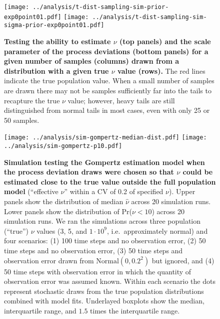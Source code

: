 \begin{figure}[htbp]
\begin{center}
\texttt{[image: ../analysis/t-dist-sampling-sim-prior-exp0point01.pdf]}
\texttt{[image: ../analysis/t-dist-sampling-sim-sigma-prior-exp0point01.pdf]}

\caption{\textbf{Testing the ability to estimate $\nu$ (top panels) and the scale parameter of the process deviations (bottom panels) for a given number of samples (columns) drawn from a distribution with a given true $\nu$ value (rows).} The red lines indicate the true population value. When a small number of samples are drawn there may not be samples sufficiently far into the tails to recapture the true $\nu$ value; however, heavy tails are still distinguished from normal tails in most cases, even with only 25 or 50 samples.}

\label{fig:sim-nu}
\end{center}
\end{figure}

\clearpage

\begin{figure}[htbp]
\begin{center}
\texttt{[image: ../analysis/sim-gompertz-median-dist.pdf]}
\texttt{[image: ../analysis/sim-gompertz-p10.pdf]}

\caption{\textbf{Simulation testing the Gompertz estimation model when the process deviation draws were chosen so that $\nu$ could be estimated close to the true value outside the full population model} (``effective $\nu$'' within a CV of 0.2 of specified $\nu$). Upper panels show the distribution of median $\widehat{\nu}$ across 20 simulation runs. Lower panels show the distribution of Pr($\nu < 10$) across 20 simulation runs. We ran the simulations across three population (``true'') $\nu$ values (3, 5, and $1\cdot 10^9$, i.e.\ approximately normal) and four scenarios: (1) 100 time steps and no observation error, (2) 50 time steps and no observation error, (3) 50 time steps and observation error drawn from $\mathrm{Normal} (0, 0.2^2)$ but ignored, and (4) 50 time steps with observation error in which the quantity of observation error was assumed known. Within each scenario the dots represent stochastic draws from the true population distributions combined with model fits. Underlayed boxplots show the median, interquartile range, and $1.5$ times the interquartile range.}

\label{fig:sim-prob}
\end{center}
\end{figure}
